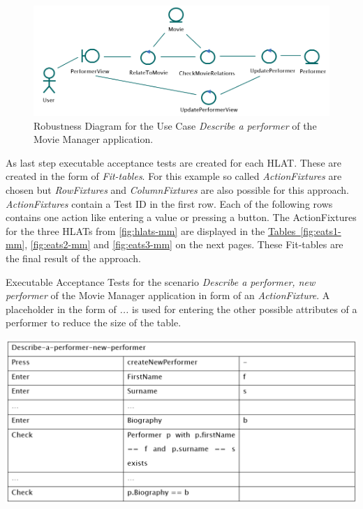 \begin{figure}[h!]
	\centering
	\includegraphics[width=.8\textwidth]{../images/ElAttarRobustness.png}
	\caption{Robustness Diagram for the Use Case \textit{Describe a performer} of the Movie Manager application.}
	\label{fig:robustness-mm}
\end{figure}



As last step executable acceptance tests are created for each HLAT.
These are created in the form of \textit{Fit-tables}.
For this example so called \textit{ActionFixtures} are chosen but \textit{RowFixtures} and \textit{ColumnFixtures} are also possible for this approach.
\textit{ActionFixtures} contain a Test ID in the first row.
Each of the following rows contains one action like entering a value or pressing a button.
The ActionFixtures for the three HLATs from  \autoref{fig:hlats-mm} are displayed in the \hyperref[labelName]{Tables~\ref{fig:eats1-mm}}, \ref{fig:eats2-mm} and \ref{fig:eats3-mm} on the next pages.
These Fit-tables are the final result of the approach.

\begin{table}[H]
	\caption{Executable Acceptance Tests for the scenario \textit{Describe a performer, new performer} of the Movie Manager application in form of an \textit{ActionFixture}. 
	A placeholder in the form of \textit{...} is used for entering the other possible attributes of a performer to reduce the size of the table.}
	\centering
	\includegraphics[width=.9\textwidth]{../images/ElAttarEATs1.png}
	\label{fig:eats1-mm}
\end{table}

